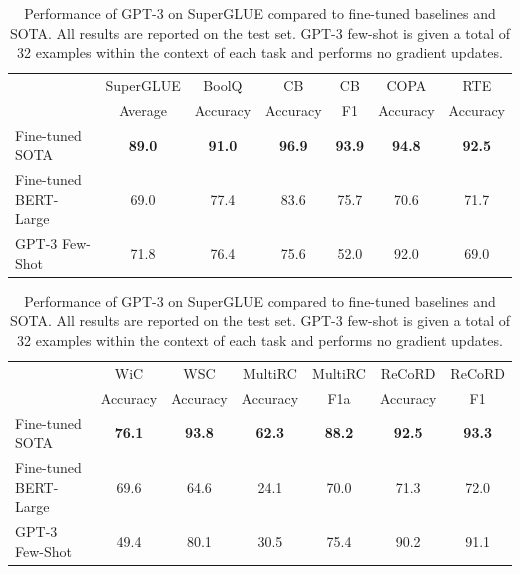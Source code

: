 \documentclass{article}
\begin{document}
\begin{table}
    
\begin{center}
\begin{tabular}{lcccccc}
\toprule
                 &  SuperGLUE &     BoolQ &        CB &    CB &      COPA &       RTE \\
                 &    Average &  Accuracy &  Accuracy &    F1 &  Accuracy &  Accuracy \\
\midrule
Fine-tuned SOTA & \textbf{89.0} & \textbf{91.0} & \textbf{96.9} & \textbf{93.9} & \textbf{94.8} & \textbf{92.5} \\        
 Fine-tuned BERT-Large &       69.0 &      77.4 &      83.6 &  75.7 &      70.6 &      71.7 \\
GPT-3 Few-Shot &       71.8 &      76.4 &      75.6 &  52.0 &      92.0 &      69.0 \\
\end{tabular}
\end{center}

\begin{center}
\begin{tabular}{lcccccc}
\toprule
                 &       WiC &       WSC &   MultiRC &  MultiRC &    ReCoRD &  ReCoRD \\
                 &  Accuracy &  Accuracy &  Accuracy &      F1a &  Accuracy &      F1 \\
\midrule
       Fine-tuned SOTA &   \textbf{76.1} &   \textbf{93.8} &   \textbf{62.3} &  \textbf{88.2} &   \textbf{92.5} & \textbf{93.3} \\
 Fine-tuned BERT-Large &      69.6 &      64.6 &      24.1 &     70.0 &      71.3 &    72.0 \\
        GPT-3 Few-Shot &      49.4 &      80.1 &      30.5 &     75.4 &      90.2 &    91.1 \\
\bottomrule
\end{tabular}
\end{center}

    \caption{
    Performance of GPT-3 on SuperGLUE compared to fine-tuned baselines and SOTA. All results are reported on the test set. GPT-3 few-shot is given a total of 32 examples within the context of each task and performs no gradient updates.
    }
    \label{table:superglue}
\end{table}
\end{document}
